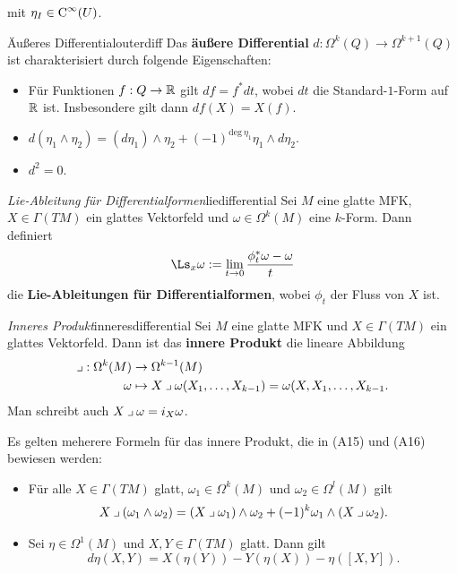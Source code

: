 mit $\eta_I \in \cinf{U}$.
\begin{definition}{Äußeres Differential}{outerdiff}
Das \textbf{äußere Differential} $d: \Omega^k (Q) \to \Omega^{k+1} (Q)$ ist charakterisiert durch folgende Eigenschaften:
\begin{itemize}
\item Für Funktionen $f: Q \to \mathbb{R}$ gilt $df = f^\ast dt$, wobei $dt$ die Standard-$1$-Form auf $\mathbb{R}$ ist. Insbesondere gilt dann $df(X) = X(f)$.
\item $d(\eta_1 \wedge \eta_2) = (d \eta_1) \wedge \eta_2 + (-1)^{\text{deg} \ \eta_1} \eta_1 \wedge d \eta_2$.
\item $d^2 = 0$.
\end{itemize}
\end{definition}
\begin{definition}{\textit{Lie-Ableitung für Differentialformen}}{liedifferential}
Sei $M$ eine glatte MFK, $X \in \Gamma(TM)$ ein glattes Vektorfeld und $\omega \in \Omega^k(M)$ eine $k$-Form. Dann definiert
\begin{equation}
\Ls_x \omega := \lim_{t \to 0} \frac{\phi_t^\ast \omega - \omega}{t}
\end{equation}
die \textbf{Lie-Ableitungen für Differentialformen}, wobei $\phi_t$ der Fluss von $X$ ist.
\end{definition}
\begin{definition}{\textit{Inneres Produkt}}{inneresdifferential}
Sei $M$ eine glatte MFK und $X \in \Gamma(TM)$ ein glattes Vektorfeld. Dann ist das \textbf{innere Produkt} die lineare Abbildung
\begin{align}
\mathbin{\lrcorner}: \Omega^k(M) &\to \Omega^{k-1}(M)\\
\omega &\mapsto X \mathbin{\lrcorner} \omega(X_1, \dots, X_{k-1}) = \omega(X, X_1, \dots, X_{k-1}.
\end{align}
Man schreibt auch $X \mathbin{\lrcorner} \omega = i_X \omega$.
\end{definition}
\begin{bemerkung}
Es gelten meherere Formeln für das innere Produkt, die in (A15) und (A16) bewiesen werden:
\begin{itemize}
\item Für alle $X \in \Gamma(TM)$ glatt, $\omega_1 \in \Omega^k(M)$ und $\omega_2 \in \Omega^l(M)$ gilt 
\begin{equation}
X \mathbin{\lrcorner} (\omega_1 \wedge \omega_2) = (X \mathbin{\lrcorner} \omega_1) \wedge \omega_2 + (-1)^k \omega_1 \wedge (X \mathbin{\lrcorner} \omega_2).
\end{equation}
\item Sei $\eta \in \Omega^1(M)$ und $X,Y \in \Gamma(TM)$ glatt. Dann gilt
\begin{equation}
d\eta(X,Y) = X(\eta(Y))-Y(\eta(X))-\eta([X,Y]).
\end{equation}
\end{itemize}
\end{bemerkung}
